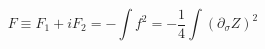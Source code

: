 \begin{equation}
\label{deff}
F\equiv F_1+iF_2= -\int f^2=-\frac{1}{4}\int (\partial_{\sigma}Z)^2
\end{equation}

